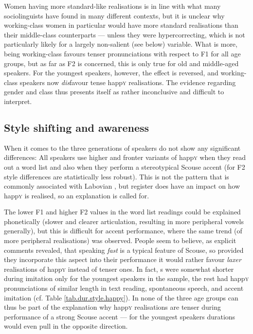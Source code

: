 Women having more standard-like realisations is in line with what many sociolinguists have found in many different contexts, but it is unclear why working-class women in particular would have more standard realisations than their middle-class counterparts --- unless they were hypercorrecting, which is not particularly likely for a largely non-salient (see below) variable.
What is more, being working-class favours tenser pronunciations with respect to F1 for all age groups, but as far as F2 is concerned, this is only true for old and middle-aged speakers.
For the youngest speakers, however, the effect is reversed, and working-class speakers now \emph{dis}favour tense happ\textsc{y} realisations.
The evidence regarding gender and class thus presents itself as rather inconclusive and difficult to interpret.

\subsection{Style shifting and awareness}
\label{prod.disc.happy.style}

When it comes to  the three generations of speakers do not show any significant differences: All speakers use higher and fronter variants of happ\textsc{y} when they read out a word list and also when they perform a stereotypical Scouse accent (for F2 style differences are statistically less robust).
This is not the pattern that is commonly associated with Labovian , but register does have an impact on how happ\textsc{y} is realised, so an explanation is called for.

The lower F1 and higher F2 values in the word list readings could be explained phonetically (slower and clearer articulation, resulting in more peripheral vowels generally), but this is difficult for accent performance, where the same trend (of more peripheral realisations) was observed.
People seem to believe, as explicit comments revealed, that speaking \emph{fast} is a typical feature of Scouse, so provided they incorporate this aspect into their  performance it would rather favour \emph{laxer} realisations of happ\textsc{y} instead of tenser ones.
In fact, s were somewhat shorter during imitation only for the youngest speakers in the sample, the rest had happ\textsc{y} pronunciations of similar length in text reading, spontaneous speech, and accent imitation (cf. Table \ref{tab.dur.style.happy}).
In none of the three age groups can  thus be part of the explanation why happ\textsc{y} realisations are tenser during performance of a strong Scouse accent --- for the youngest speakers durations would even pull in the opposite direction.

